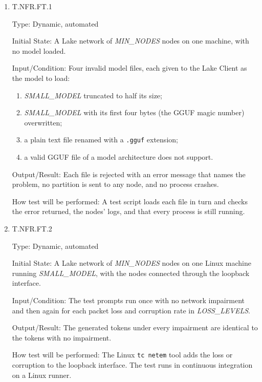 \documentclass[12pt, titlepage]{article}
\begin{document}
\begin{enumerate}

\item{T.NFR.FT.1\\}
\label{T.NFR.FT.1}

Type: Dynamic, automated

Initial State: A Lake network of \textit{MIN\_NODES} nodes on one machine, with no model loaded.

Input/Condition: Four invalid model files, each given to the Lake Client as the
model to load:
\begin{enumerate}
  \item \textit{SMALL\_MODEL} truncated to half its size;
  \item \textit{SMALL\_MODEL} with its first four bytes (the GGUF magic number)
    overwritten;
  \item a plain text file renamed with a \texttt{.gguf} extension;
  \item a valid GGUF file of a model architecture \progname{} does not support.
\end{enumerate}

Output/Result: Each file is rejected with an error message that names the
problem, no partition is sent to any node, and no process crashes.

How test will be performed: A test script loads each file in turn and checks
the error returned, the nodes' logs, and that every process is still running.

\item{T.NFR.FT.2\\}
\label{T.NFR.FT.2}

Type: Dynamic, automated

Initial State: A Lake network of \textit{MIN\_NODES} nodes on one Linux machine running
\textit{SMALL\_MODEL}, with the nodes connected through the loopback interface.

Input/Condition: The test prompts run once with no network impairment and
then again for each packet loss and corruption rate in \textit{LOSS\_LEVELS}.

Output/Result: The generated tokens under every impairment are identical to the
tokens with no impairment.

How test will be performed: The Linux \texttt{tc netem} tool adds the loss or
corruption to the loopback interface. The test runs in continuous integration
on a Linux runner.

\end{enumerate}
\end{document}
